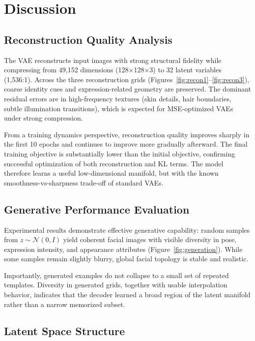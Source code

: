 \documentclass[conference]{IEEEtran}
\begin{document}
\section{Discussion}

\subsection{Reconstruction Quality Analysis}

The VAE reconstructs input images with strong structural fidelity while compressing from 49,152 dimensions (128×128×3) to 32 latent variables (1,536:1). Across the three reconstruction grids (Figures~\ref{fig:recon1}--\ref{fig:recon3}), coarse identity cues and expression-related geometry are preserved. The dominant residual errors are in high-frequency textures (skin details, hair boundaries, subtle illumination transitions), which is expected for MSE-optimized VAEs under strong compression.

From a training dynamics perspective, reconstruction quality improves sharply in the first 10 epochs and continues to improve more gradually afterward. The final training objective is substantially lower than the initial objective, confirming successful optimization of both reconstruction and KL terms. The model therefore learns a useful low-dimensional manifold, but with the known smoothness-vs-sharpness trade-off of standard VAEs.

\subsection{Generative Performance Evaluation}

Experimental results demonstrate effective generative capability: random samples from $z \sim \mathcal{N}(0, I)$ yield coherent facial images with visible diversity in pose, expression intensity, and appearance attributes (Figure~\ref{fig:generation}). While some samples remain slightly blurry, global facial topology is stable and realistic.

Importantly, generated examples do not collapse to a small set of repeated templates. Diversity in generated grids, together with usable interpolation behavior, indicates that the decoder learned a broad region of the latent manifold rather than a narrow memorized subset.

\subsection{Latent Space Structure}
\end{document}
